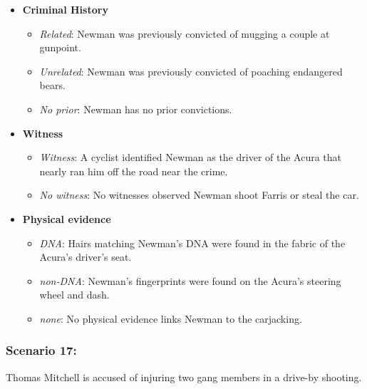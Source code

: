 \documentclass[
]{article}
\providecommand{\tightlist}{%
  \setlength{\itemsep}{0pt}\setlength{\parskip}{0pt}}
\begin{document}
\begin{itemize}
\tightlist
\item
  \textbf{Criminal History}

  \begin{itemize}
  \tightlist
  \item
    \emph{Related}: Newman was previously convicted of mugging a couple
    at gunpoint.
  \item
    \emph{Unrelated}: Newman was previously convicted of poaching
    endangered bears.
  \item
    \emph{No prior}: Newman has no prior convictions.
  \end{itemize}
\item
  \textbf{Witness}

  \begin{itemize}
  \tightlist
  \item
    \emph{Witness}: A cyclist identified Newman as the driver of the
    Acura that nearly ran him off the road near the crime.
  \item
    \emph{No witness}: No witnesses observed Newman shoot Farris or
    steal the car.
  \end{itemize}
\item
  \textbf{Physical evidence}

  \begin{itemize}
  \tightlist
  \item
    \emph{DNA}: Hairs matching Newman's DNA were found in the fabric of
    the Acura's driver's seat.
  \item
    \emph{non-DNA}: Newman's fingerprints were found on the Acura's
    steering wheel and dash.
  \item
    \emph{none}: No physical evidence links Newman to the carjacking.
  \end{itemize}
\end{itemize}

\hypertarget{scenario-17}{%
\subsubsection{Scenario 17:}\label{scenario-17}}

Thomas Mitchell is accused of injuring two gang members in a drive-by
shooting.
\end{document}
